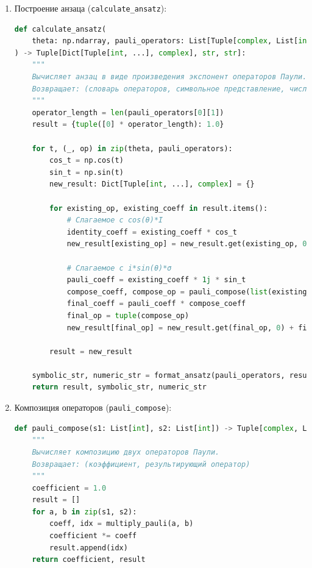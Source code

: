 \documentclass[a4paper]{report}
\begin{document}
\begin{enumerate}
\item Построение анзаца (\texttt{calculate\_ansatz}):
\begin{lstlisting}[language=Python]
def calculate_ansatz(
    theta: np.ndarray, pauli_operators: List[Tuple[complex, List[int]]]
) -> Tuple[Dict[Tuple[int, ...], complex], str, str]:
    """
    Вычисляет анзац в виде произведения экспонент операторов Паули.
    Возвращает: (словарь операторов, символьное представление, численное представление)
    """
    operator_length = len(pauli_operators[0][1])
    result = {tuple([0] * operator_length): 1.0}

    for t, (_, op) in zip(theta, pauli_operators):
        cos_t = np.cos(t)
        sin_t = np.sin(t)
        new_result: Dict[Tuple[int, ...], complex] = {}

        for existing_op, existing_coeff in result.items():
            # Слагаемое с cos(θ)*I
            identity_coeff = existing_coeff * cos_t
            new_result[existing_op] = new_result.get(existing_op, 0) + identity_coeff

            # Слагаемое с i*sin(θ)*σ
            pauli_coeff = existing_coeff * 1j * sin_t
            compose_coeff, compose_op = pauli_compose(list(existing_op), op)
            final_coeff = pauli_coeff * compose_coeff
            final_op = tuple(compose_op)
            new_result[final_op] = new_result.get(final_op, 0) + final_coeff

        result = new_result

    symbolic_str, numeric_str = format_ansatz(pauli_operators, result)
    return result, symbolic_str, numeric_str
\end{lstlisting}

\item Композиция операторов (\texttt{pauli\_compose}):
\begin{lstlisting}[language=Python]
def pauli_compose(s1: List[int], s2: List[int]) -> Tuple[complex, List[int]]:
    """
    Вычисляет композицию двух операторов Паули.
    Возвращает: (коэффициент, результирующий оператор)
    """
    coefficient = 1.0
    result = []
    for a, b in zip(s1, s2):
        coeff, idx = multiply_pauli(a, b)
        coefficient *= coeff
        result.append(idx)
    return coefficient, result
\end{lstlisting}
\end{enumerate}
\end{document}
